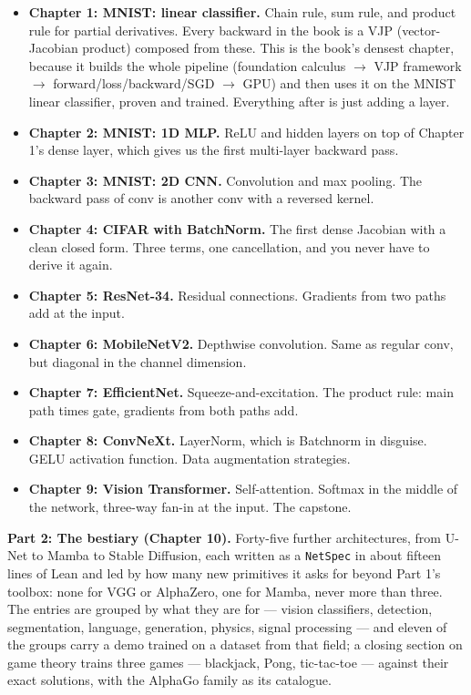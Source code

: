 \begin{itemize}
  \item \textbf{Chapter 1: MNIST: linear classifier.} Chain rule, sum
    rule, and product rule for partial derivatives. Every backward in the
    book is a VJP (vector-Jacobian product) composed from these. This is
    the book's densest chapter, because it builds the whole pipeline
    (foundation calculus \(\to\) VJP framework \(\to\)
    forward/loss/backward/SGD \(\to\) GPU) and then uses it on the MNIST
    linear classifier, proven and trained. Everything after is just
    adding a layer.
  \item \textbf{Chapter 2: MNIST: 1D MLP.} ReLU and hidden layers on top
    of Chapter 1's dense layer, which gives us the first multi-layer
    backward pass.
  \item \textbf{Chapter 3: MNIST: 2D CNN.} Convolution and max pooling.
    The backward pass of conv is another conv with a reversed kernel.
  \item \textbf{Chapter 4: CIFAR with BatchNorm.} The first dense Jacobian
    with a clean closed form. Three terms, one cancellation, and you
    never have to derive it again.
  \item \textbf{Chapter 5: ResNet-34.} Residual connections. Gradients
    from two paths add at the input.
  \item \textbf{Chapter 6: MobileNetV2.} Depthwise convolution. Same as
    regular conv, but diagonal in the channel dimension.
  \item \textbf{Chapter 7: EfficientNet.} Squeeze-and-excitation. The
    product rule: main path times gate, gradients from both paths add.
  \item \textbf{Chapter 8: ConvNeXt.} LayerNorm, which is Batchnorm in
    disguise. GELU activation function. Data augmentation strategies.
  \item \textbf{Chapter 9: Vision Transformer.} Self-attention. Softmax
    in the middle of the network, three-way fan-in at the input. The
    capstone.
\end{itemize}

\textbf{Part 2: The bestiary (Chapter 10).} Forty-five further
architectures, from U-Net to Mamba to Stable Diffusion, each written as
a \texttt{NetSpec} in about fifteen lines of Lean and led by how many new
primitives it asks for beyond Part 1's toolbox: none for VGG or
AlphaZero, one for Mamba, never more than three. The entries are grouped
by what they are for --- vision classifiers, detection, segmentation,
language, generation, physics, signal processing --- and eleven of the
groups carry a demo trained on a dataset from that field; a closing section on
game theory trains three games --- blackjack, Pong, tic-tac-toe --- against their
exact solutions, with the AlphaGo family as its catalogue.

